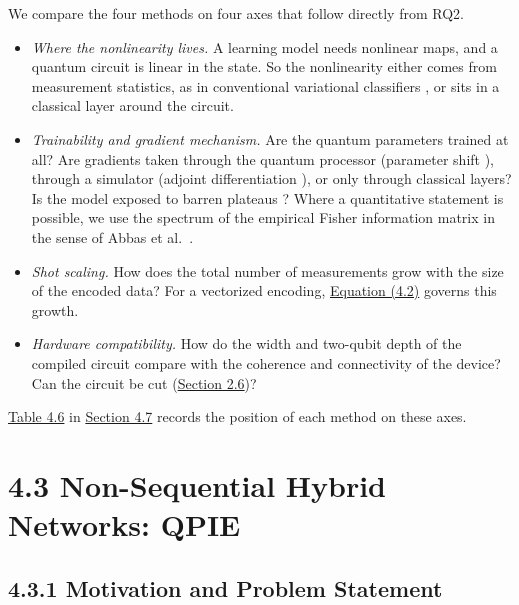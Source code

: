 \documentclass{report}
\theoremstyle{plain}
\theoremstyle{definition}
\theoremstyle{remark}
\begin{document}
We compare the four methods on four axes that follow directly from RQ2.
\begin{itemize}
\item \emph{Where the nonlinearity lives.} A learning model needs nonlinear maps, and a quantum circuit is linear in the state. So the nonlinearity either comes from measurement statistics, as in conventional variational classifiers \cite{schuld2020circuitcentric,perezsalinas2020reuploading}, or sits in a classical layer around the circuit.
\item \emph{Trainability and gradient mechanism.} Are the quantum parameters trained at all? Are gradients taken through the quantum processor (parameter shift \cite{crooks2019parametershift}), through a simulator (adjoint differentiation \cite{jones2020adjoint}), or only through classical layers? Is the model exposed to barren plateaus \cite{mcclean2018barren}? Where a quantitative statement is possible, we use the spectrum of the empirical Fisher information matrix in the sense of Abbas et al.~\cite{abbas2021powerqnn}.
\item \emph{Shot scaling.} How does the total number of measurements grow with the size of the encoded data? For a vectorized encoding, \hyperref[eq:qml:readout]{Equation (4.2)} governs this growth.
\item \emph{Hardware compatibility.} How do the width and two-qubit depth of the compiled circuit compare with the coherence and connectivity of the device? Can the circuit be cut (\hyperref[sec:bg:cutting]{Section 2.6})?
\end{itemize}
\hyperref[tab:qml:synthesis]{Table 4.6} in \hyperref[sec:qml:synthesis]{Section 4.7} records the position of each method on these axes.

\section{4.3 Non-Sequential Hybrid Networks: QPIE}\label{sec:qml:qpie}

\subsection{4.3.1 Motivation and Problem Statement}\label{sec:qml:qpie:motivation}
\end{document}
